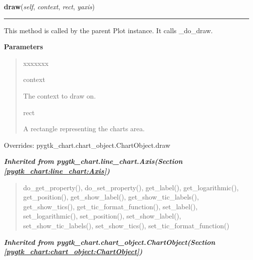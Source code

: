     \vspace{0.5ex}

\hspace{.8\funcindent}\begin{boxedminipage}{\funcwidth}

    \raggedright \textbf{draw}(\textit{self}, \textit{context}, \textit{rect}, \textit{yaxis})

    \vspace{-1.5ex}

    \rule{\textwidth}{0.5\fboxrule}
\setlength{\parskip}{2ex}
    This method is called by the parent Plot instance. It calls \_do\_draw.

\setlength{\parskip}{1ex}
      \textbf{Parameters}
      \vspace{-1ex}

      \begin{quote}
        \begin{Ventry}{xxxxxxx}

          \item[context]

          The context to draw on.

          \item[rect]

          A rectangle representing the charts area.

        \end{Ventry}

      \end{quote}

      Overrides: pygtk\_chart.chart\_object.ChartObject.draw

    \end{boxedminipage}


\large{\textbf{\textit{Inherited from pygtk\_chart.line\_chart.Axis\textit{(Section \ref{pygtk_chart:line_chart:Axis})}}}}

\begin{quote}
do\_get\_property(), do\_set\_property(), get\_label(), get\_logarithmic(), get\_position(), get\_show\_label(), get\_show\_tic\_labels(), get\_show\_tics(), get\_tic\_format\_function(), set\_label(), set\_logarithmic(), set\_position(), set\_show\_label(), set\_show\_tic\_labels(), set\_show\_tics(), set\_tic\_format\_function()
\end{quote}

\large{\textbf{\textit{Inherited from pygtk\_chart.chart\_object.ChartObject\textit{(Section \ref{pygtk_chart:chart_object:ChartObject})}}}}

